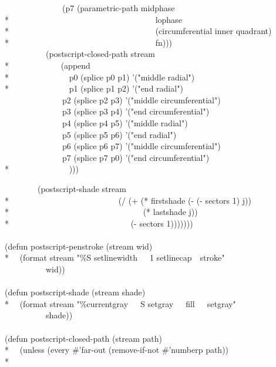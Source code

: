 \begin{new}
\begin{lisp}
~~~~~~~~~~~~~~(p7 (parametric-path midphase \\*
~~~~~~~~~~~~~~~~~~~~~~~~~~~~~~~~~~~lophase \\*
~~~~~~~~~~~~~~~~~~~~~~~~~~~~~~~~~~~(circumferential inner quadrant) \\*
~~~~~~~~~~~~~~~~~~~~~~~~~~~~~~~~~~~fn))) \\
~~~~~~~~~~(postscript-closed-path stream \\*
~~~~~~~~~~~~(append \\*
~~~~~~~~~~~~~~p0 (splice p0 p1) '("middle radial") \\*
~~~~~~~~~~~~~~p1 (splice p1 p2) '("end radial") \\
~~~~~~~~~~~~~~p2 (splice p2 p3) '("middle circumferential") \\
~~~~~~~~~~~~~~p3 (splice p3 p4) '("end circumferential") \\
~~~~~~~~~~~~~~p4 (splice p4 p5) '("middle radial") \\
~~~~~~~~~~~~~~p5 (splice p5 p6) '("end radial") \\
~~~~~~~~~~~~~~p6 (splice p6 p7) '("middle circumferential") \\
~~~~~~~~~~~~~~p7 (splice p7 p0) '("end circumferential") \\*
~~~~~~~~~~~~~~)))
\end{lisp}
 \newpage%
\begin{lisp}
~~~~~~~~(postscript-shade stream \\*
~~~~~~~~~~~~~~~~~~~~~~~~~~(/ (+ (* firstshade (- (- sectors 1) j)) \\*
~~~~~~~~~~~~~~~~~~~~~~~~~~~~~~~~(* lastshade j)) \\*
~~~~~~~~~~~~~~~~~~~~~~~~~~~~~(- sectors 1))))))) \\
\\
(defun postscript-penstroke (stream wid) \\*
~~(format stream "{\Xtilde}\%{\Xtilde}S setlinewidth~~~1 setlinecap~~stroke" \\
~~~~~~~~~~wid)) \\
\\
(defun postscript-shade (stream shade) \\*
~~(format stream "{\Xtilde}\%currentgray~~~{\Xtilde}S setgray~~~fill~~~setgray" \\
~~~~~~~~~~shade)) \\
\\
(defun postscript-closed-path (stream path) \\*
~~(unless (every \#'far-out (remove-if-not \#'numberp path)) \\*

\end{lisp}
\end{new}

